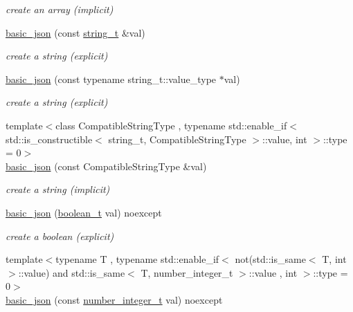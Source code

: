 \begin{DoxyCompactItemize}
\begin{DoxyCompactList}\small\item\em create an array (implicit) \end{DoxyCompactList}\item 
\hyperlink{a00025_ab8b43d92a042dde96c28aeea81dd52de}{basic\+\_\+json} (const \hyperlink{a00025_ab63e618bbb0371042b1bec17f5891f42}{string\+\_\+t} \&val)
\begin{DoxyCompactList}\small\item\em create a string (explicit) \end{DoxyCompactList}\item 
\hyperlink{a00025_a3654da9a84deaf61899c4eee5b93c2c5}{basic\+\_\+json} (const typename string\+\_\+t\+::value\+\_\+type $\ast$val)
\begin{DoxyCompactList}\small\item\em create a string (explicit) \end{DoxyCompactList}\item 
{\footnotesize template$<$class Compatible\+String\+Type , typename std\+::enable\+\_\+if$<$                                                                  std\+::is\+\_\+constructible$<$ string\+\_\+t, Compatible\+String\+Type $>$\+::value, int $>$\+::type  = 0$>$ }\\\hyperlink{a00025_ae85d91b0620650bcd9993e09d0e287d9}{basic\+\_\+json} (const Compatible\+String\+Type \&val)
\begin{DoxyCompactList}\small\item\em create a string (implicit) \end{DoxyCompactList}\item 
\hyperlink{a00025_aac36af84d907b5c3e469af889661620a}{basic\+\_\+json} (\hyperlink{a00025_af3bc3e83aa162d7ba4df16a949872723}{boolean\+\_\+t} val) noexcept
\begin{DoxyCompactList}\small\item\em create a boolean (explicit) \end{DoxyCompactList}\item 
{\footnotesize template$<$typename T , typename std\+::enable\+\_\+if$<$                                                              not(std\+::is\+\_\+same$<$ T, int $>$\+::value)                                                           and std\+::is\+\_\+same$<$ T, number\+\_\+integer\+\_\+t $>$\+::value                                                           , int $>$\+::type  = 0$>$ }\\\hyperlink{a00025_a0d838bc7ffca6017f51167e0a8ffd9b6}{basic\+\_\+json} (const \hyperlink{a00025_ac4b10b2364f26ce47bdb9a413ff04a59}{number\+\_\+integer\+\_\+t} val) noexcept

\end{DoxyCompactItemize}
